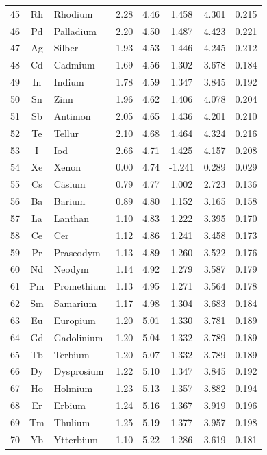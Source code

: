 \documentclass[12pt,a4paper]{article}
\begin{document}
\begin{longtable}{|c|c|p{2.5cm}|c|c|c|c|c|}
		45 & Rh & Rhodium & 2.28 & 4.46 & 1.458 & 4.301 & 0.215 \\
		46 & Pd & Palladium & 2.20 & 4.50 & 1.487 & 4.423 & 0.221 \\
		47 & Ag & Silber & 1.93 & 4.53 & 1.446 & 4.245 & 0.212 \\
		48 & Cd & Cadmium & 1.69 & 4.56 & 1.302 & 3.678 & 0.184 \\
		49 & In & Indium & 1.78 & 4.59 & 1.347 & 3.845 & 0.192 \\
		50 & Sn & Zinn & 1.96 & 4.62 & 1.406 & 4.078 & 0.204 \\
		51 & Sb & Antimon & 2.05 & 4.65 & 1.436 & 4.201 & 0.210 \\
		52 & Te & Tellur & 2.10 & 4.68 & 1.464 & 4.324 & 0.216 \\
		53 & I & Iod & 2.66 & 4.71 & 1.425 & 4.157 & 0.208 \\
		54 & Xe & Xenon & 0.00 & 4.74 & -1.241 & 0.289 & 0.029 \\
		55 & Cs & Cäsium & 0.79 & 4.77 & 1.002 & 2.723 & 0.136 \\
		56 & Ba & Barium & 0.89 & 4.80 & 1.152 & 3.165 & 0.158 \\
		57 & La & Lanthan & 1.10 & 4.83 & 1.222 & 3.395 & 0.170 \\
		58 & Ce & Cer & 1.12 & 4.86 & 1.241 & 3.458 & 0.173 \\
		59 & Pr & Praseodym & 1.13 & 4.89 & 1.260 & 3.522 & 0.176 \\
		60 & Nd & Neodym & 1.14 & 4.92 & 1.279 & 3.587 & 0.179 \\
		61 & Pm & Promethium & 1.13 & 4.95 & 1.271 & 3.564 & 0.178 \\
		62 & Sm & Samarium & 1.17 & 4.98 & 1.304 & 3.683 & 0.184 \\
		63 & Eu & Europium & 1.20 & 5.01 & 1.330 & 3.781 & 0.189 \\
		64 & Gd & Gadolinium & 1.20 & 5.04 & 1.332 & 3.789 & 0.189 \\
		65 & Tb & Terbium & 1.20 & 5.07 & 1.332 & 3.789 & 0.189 \\
		66 & Dy & Dysprosium & 1.22 & 5.10 & 1.347 & 3.845 & 0.192 \\
		67 & Ho & Holmium & 1.23 & 5.13 & 1.357 & 3.882 & 0.194 \\
		68 & Er & Erbium & 1.24 & 5.16 & 1.367 & 3.919 & 0.196 \\
		69 & Tm & Thulium & 1.25 & 5.19 & 1.377 & 3.957 & 0.198 \\
		70 & Yb & Ytterbium & 1.10 & 5.22 & 1.286 & 3.619 & 0.181 \\

\end{longtable}
\end{document}
